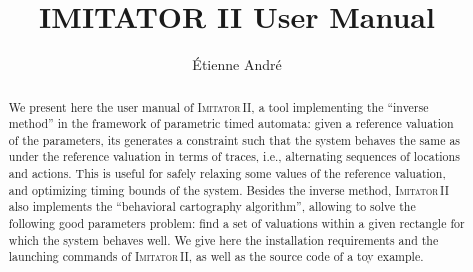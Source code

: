 \documentclass[a4paper,10pt]{article}
\title{IMITATOR II User Manual}
\author{\'Etienne Andr\'e}
\newcommand{\imitatordeux}{\textsc{Imitator}\,II}
\begin{document}
\maketitle







\begin{abstract}
We present here the user manual of \imitatordeux{}, a tool implementing the ``inverse method'' in the framework of parametric timed automata:
given a reference valuation of the parameters, its generates a constraint such that the system behaves the same as under the reference valuation in terms of traces, i.e., alternating sequences of locations and actions.
This is useful for safely relaxing some values of the reference valuation, and optimizing timing bounds of the system.
Besides the inverse method, \imitatordeux{} also implements the ``behavioral cartography algorithm'', allowing to solve the following good parameters problem: find a set of valuations within a given rectangle for which the system behaves well.
We give here the installation requirements and the launching commands of \imitatordeux{}, as well as the source code of a toy example.
\end{abstract}



\end{document}
